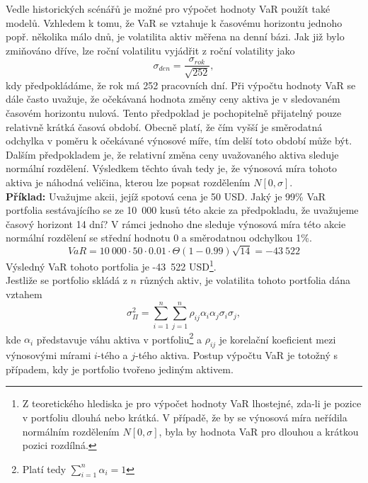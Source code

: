 \documentclass[a4paper]{book}
\begin{document}
Vedle historických scénářů je možné pro výpočet hodnoty VaR použít také modelů. Vzhledem k tomu, že VaR se vztahuje k časovému horizontu jednoho popř. několika málo dnů, je volatilita aktiv měřena na denní bázi. Jak již bylo zmiňováno dříve, lze roční volatilitu vyjádřit z roční volatility jako
\begin{equation*}
\sigma_{den} = \frac{\sigma_{rok}}{\sqrt{252}},
\end{equation*}
kdy předpokládáme, že rok má 252 pracovních dní.
Při výpočtu hodnoty VaR se dále často uvažuje, že očekávaná hodnota změny ceny aktiva je v sledovaném časovém horizontu nulová. Tento předpoklad je pochopitelně přijatelný pouze relativně krátká časová období. Obecně platí, že čím vyšší je směrodatná odchylka v poměru k očekávané výnosové míře, tím delší toto období může být. Dalším předpokladem je, že relativní změna ceny uvažovaného aktiva sleduje normální rozdělení. Výsledkem těchto úvah tedy je, že výnosová míra tohoto aktiva je náhodná veličina, kterou lze popsat rozdělením $N[0,\sigma]$.\\

\noindent \textbf{Příklad:} Uvažujme akcii, jejíž spotová cena je 50 USD. Jaký je 99\% VaR portfolia sestávajícího se ze 10~000 kusů této akcie za předpokladu, že uvažujeme časový horizont 14 dní? V rámci jednoho dne sleduje výnosová míra této akcie normální rozdělení se střední hodnotu 0 a směrodatnou odchylkou 1\%.\\
\begin{equation*}
VaR= 10~000 \cdot 50 \cdot 0.01 \cdot \Theta(1-0.99) \sqrt{14} = -43~522
\end{equation*}
Výsledný VaR tohoto portfolia je -43~522 USD\footnote{Z teoretického hlediska je pro výpočet hodnoty VaR lhostejné, zda-li je pozice v portfoliu dlouhá nebo krátká. V případě, že by se výnosová míra neřídila normálním rozdělením $N[0,\sigma]$, byla by hodnota VaR pro dlouhou a krátkou pozici rozdílná.}.\\

Jestliže se portfolio skládá z $n$ různých aktiv, je volatilita tohoto portfolia dána vztahem
\begin{equation*}
\sigma_{\Pi}^2 = \sum_{i=1}^n \sum_{j=1}^n \rho_{ij} \alpha_i \alpha_j \sigma_i \sigma_j,
\end{equation*}
kde $\alpha_i$ představuje váhu aktiva v portfoliu\footnote{Platí tedy $\sum_{i=1}^n \alpha_i=1$} a $\rho_{ij}$ je korelační koeficient mezi výnosovými mírami $i$-tého a $j$-tého aktiva. Postup výpočtu VaR je totožný s případem, kdy je portfolio tvořeno jediným aktivem.
\end{document}
